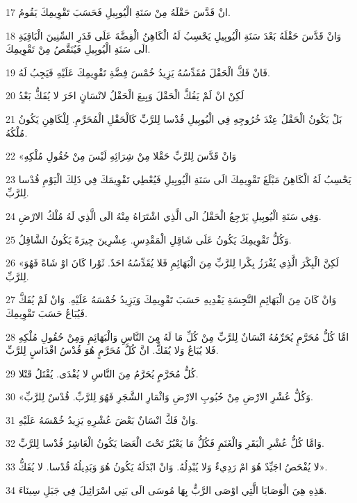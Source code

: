 \par 17 انْ قَدَّسَ حَقْلَهُ مِنْ سَنَةِ الْيُوبِيلِ فَحَسَبَ تَقْوِيمِكَ يَقُومُ.
\par 18 وَانْ قَدَّسَ حَقْلَهُ بَعْدَ سَنَةِ الْيُوبِيلِ يَحْسِبُ لَهُ الْكَاهِنُ الْفِضَّةَ عَلَى قَدَرِ السِّنِينَ الْبَاقِيَةِ الَى سَنَةِ الْيُوبِيلِ فَيُنَقَّصُ مِنْ تَقْوِيمِكَ.
\par 19 فَانْ فَكَّ الْحَقْلَ مُقَدِّسُهُ يَزِيدُ خُمْسَ فِضَّةِ تَقْوِيمِكَ عَلَيْهِ فَيَجِبُ لَهُ.
\par 20 لَكِنْ انْ لَمْ يَفُكَّ الْحَقْلَ وَبِيعَ الْحَقْلُ لانْسَانٍ اخَرَ لا يُفَكُّ بَعْدُ
\par 21 بَلْ يَكُونُ الْحَقْلُ عِنْدَ خُرُوجِهِ فِي الْيُوبِيلِ قُدْسا لِلرَّبِّ كَالْحَقْلِ الْمُحَرَّمِ. لِلْكَاهِنِ يَكُونُ مُلْكُهُ.
\par 22 «وَانْ قَدَّسَ لِلرَّبِّ حَقْلا مِنْ شِرَائِهِ لَيْسَ مِنْ حُقُولِ مُلْكِهِ
\par 23 يَحْسِبُ لَهُ الْكَاهِنُ مَبْلَغَ تَقْوِيمِكَ الَى سَنَةِ الْيُوبِيلِ فَيُعْطِي تَقْوِيمَكَ فِي ذَلِكَ الْيَوْمِ قُدْسا لِلرَّبِّ.
\par 24 وَفِي سَنَةِ الْيُوبِيلِ يَرْجِعُ الْحَقْلُ الَى الَّذِي اشْتَرَاهُ مِنْهُ الَى الَّذِي لَهُ مُلْكُ الارْضِ.
\par 25 وَكُلُّ تَقْوِيمِكَ يَكُونُ عَلَى شَاقِلِ الْمَقْدِسِ. عِشْرِينَ جِيرَةً يَكُونُ الشَّاقِلُ.
\par 26 «لَكِنَّ الْبِكْرَ الَّذِي يُفْرَزُ بِكْرا لِلرَّبِّ مِنَ الْبَهَائِمِ فَلا يُقَدِّسُهُ احَدٌ. ثَوْرا كَانَ اوْ شَاةً فَهُوَ لِلرَّبِّ.
\par 27 وَانْ كَانَ مِنَ الْبَهَائِمِ النَّجِسَةِ يَفْدِيهِ حَسَبَ تَقْوِيمِكَ وَيَزِيدُ خُمْسَهُ عَلَيْهِ. وَانْ لَمْ يُفَكَّ فَيُبَاعُ حَسَبَ تَقْوِيمِكَ.
\par 28 امَّا كُلُّ مُحَرَّمٍ يُحَرِّمُهُ انْسَانٌ لِلرَّبِّ مِنْ كُلِّ مَا لَهُ مِنَ النَّاسِ وَالْبَهَائِمِ وَمِنْ حُقُولِ مُلْكِهِ فَلا يُبَاعُ وَلا يُفَكُّ. انَّ كُلَّ مُحَرَّمٍ هُوَ قُدْسُ اقْدَاسٍ لِلرَّبِّ.
\par 29 كُلُّ مُحَرَّمٍ يُحَرَّمُ مِنَ النَّاسِ لا يُفْدَى. يُقْتَلُ قَتْلا.
\par 30 «وَكُلُّ عُشْرِ الارْضِ مِنْ حُبُوبِ الارْضِ وَاثْمَارِ الشَّجَرِ فَهُوَ لِلرَّبِّ. قُدْسٌ لِلرَّبِّ.
\par 31 وَانْ فَكَّ انْسَانٌ بَعْضَ عُشْرِهِ يَزِيدُ خُمْسَهُ عَلَيْهِ.
\par 32 وَامَّا كُلُّ عُشْرِ الْبَقَرِ وَالْغَنَمِ فَكُلُّ مَا يَعْبُرُ تَحْتَ الْعَصَا يَكُونُ الْعَاشِرُ قُدْسا لِلرَّبِّ.
\par 33 لا يُفْحَصُ اجَيِّدٌ هُوَ امْ رَدِيءٌ وَلا يُبْدِلُهُ. وَانْ ابْدَلَهُ يَكُونُ هُوَ وَبَدِيلُهُ قُدْسا. لا يُفَكُّ».
\par 34 هَذِهِ هِيَ الْوَصَايَا الَّتِي اوْصَى الرَّبُّ بِهَا مُوسَى الَى بَنِي اسْرَائِيلَ فِي جَبَلِ سِينَاءَ.


